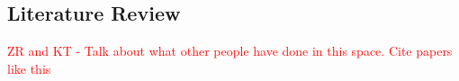      

\subsection{Literature Review}
\textcolor{red}{ZR and KT - Talk about what other people have done in this space.  Cite papers like this\cite{Lum_Risk_for_UAVs_2010}}

